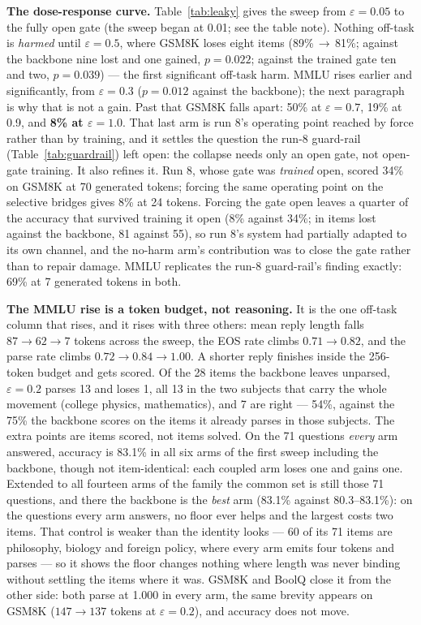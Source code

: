 \documentclass[11pt]{article}
\begin{document}
\textbf{The dose-response curve.} Table~\ref{tab:leaky} gives the sweep from $\varepsilon = 0.05$ to the fully open gate (the sweep began at 0.01; see the table note). Nothing off-task is \emph{harmed} until $\varepsilon = 0.5$, where GSM8K loses eight items (89\%\,$\to$\,81\%; against the backbone nine lost and one gained, $p = 0.022$; against the trained gate ten and two, $p = 0.039$) --- the first significant off-task harm. MMLU rises earlier and significantly, from $\varepsilon = 0.3$ ($p = 0.012$ against the backbone); the next paragraph is why that is not a gain. Past that GSM8K falls apart: 50\% at $\varepsilon = 0.7$, 19\% at 0.9, and \textbf{8\% at $\varepsilon = 1.0$}. That last arm is run 8's operating point reached by force rather than by training, and it settles the question the run-8 guard-rail (Table~\ref{tab:guardrail}) left open: the collapse needs only an open gate, not open-gate training. It also refines it. Run 8, whose gate was \emph{trained} open, scored 34\% on GSM8K at 70 generated tokens; forcing the same operating point on the selective bridges gives 8\% at 24 tokens. Forcing the gate open leaves a quarter of the accuracy that survived training it open (8\% against 34\%; in items lost against the backbone, 81 against 55), so run 8's system had partially adapted to its own channel, and the no-harm arm's contribution was to close the gate rather than to repair damage. MMLU replicates the run-8 guard-rail's finding exactly: 69\% at 7 generated tokens in both.

\textbf{The MMLU rise is a token budget, not reasoning.} It is the one off-task column that rises, and it rises with three others: mean reply length falls $87 \to 62 \to 7$ tokens across the sweep, the EOS rate climbs $0.71 \to 0.82$, and the parse rate climbs $0.72 \to 0.84 \to 1.00$. A shorter reply finishes inside the 256-token budget and gets scored. Of the 28 items the backbone leaves unparsed, $\varepsilon = 0.2$ parses 13 and loses 1, all 13 in the two subjects that carry the whole movement (college physics, mathematics), and 7 are right --- 54\%, against the 75\% the backbone scores on the items it already parses in those subjects. The extra points are items scored, not items solved. On the 71 questions \emph{every} arm answered, accuracy is 83.1\% in all six arms of the first sweep including the backbone, though not item-identical: each coupled arm loses one and gains one. Extended to all fourteen arms of the family the common set is still those 71 questions, and there the backbone is the \emph{best} arm (83.1\% against 80.3--83.1\%): on the questions every arm answers, no floor ever helps and the largest costs two items. That control is weaker than the identity looks --- 60 of its 71 items are philosophy, biology and foreign policy, where every arm emits four tokens and parses --- so it shows the floor changes nothing where length was never binding without settling the items where it was. GSM8K and BoolQ close it from the other side: both parse at 1.000 in every arm, the same brevity appears on GSM8K ($147 \to 137$ tokens at $\varepsilon = 0.2$), and accuracy does not move.
\end{document}
